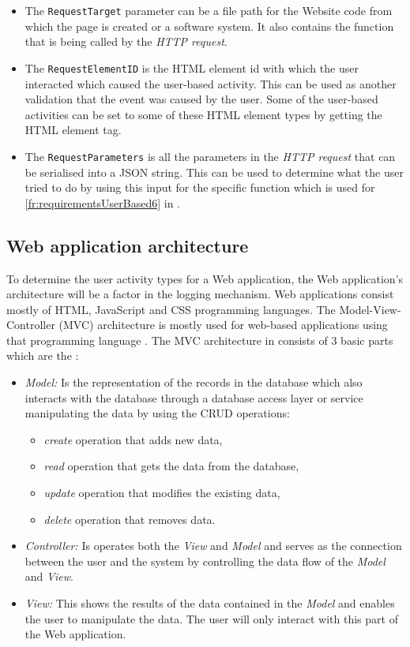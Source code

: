 \begin{itemize}
	\item The \texttt{RequestTarget} parameter can be a file path for the Website code from which the page is created or a software system. It also contains the function that is being called by the \textit{HTTP request}.
	\item The \texttt{RequestElementID} is the HTML element id with which the user interacted which caused the user-based activity. This can be used as another validation that the event was caused by the user. Some of the user-based activities can be set to some of these HTML element types by getting the HTML element tag.
	\item The \texttt{RequestParameters} is all the parameters in the \textit{HTTP request} that can be serialised into a JSON string. This can be used to determine what the user tried to do by using this input for the specific function which is used for \ref{fr:requirementsUserBased6} in .
\end{itemize}

\subsection{Web application architecture}\label{sec:ch2_webApplicationArchitecture}
To determine the user activity types for a Web application, the Web application's architecture will be a factor in the logging mechanism. Web applications consist mostly of HTML, JavaScript and CSS programming languages. The Model-View-Controller (MVC) architecture is mostly used for web-based applications using that programming language \cite{Jailia2016}. The MVC architecture in  consists of 3 basic parts which are the \cite{Jailia2016}:

\begin{itemize}
	\item \textit{Model:} Is the representation of the records in the database which also interacts with the database through a database access layer or service manipulating the data by using the CRUD operations:
	\begin{itemize}
		\item \textit{create} operation that adds new data,
		\item \textit{read} operation that gets the data from the database,
		\item \textit{update} operation that modifies the existing data,
		\item \textit{delete} operation that removes data.
	\end{itemize}
	\item \textit{Controller:} Is operates both the \textit{View} and \textit{Model} and serves as the connection between the user and the system by controlling the data flow of the \textit{Model} and
	\textit{View}.
	\item \textit{View:} This shows the results of the data contained in the \textit{Model} and enables the user to manipulate the data. The user will only interact with this part of the Web application.
\end{itemize}

